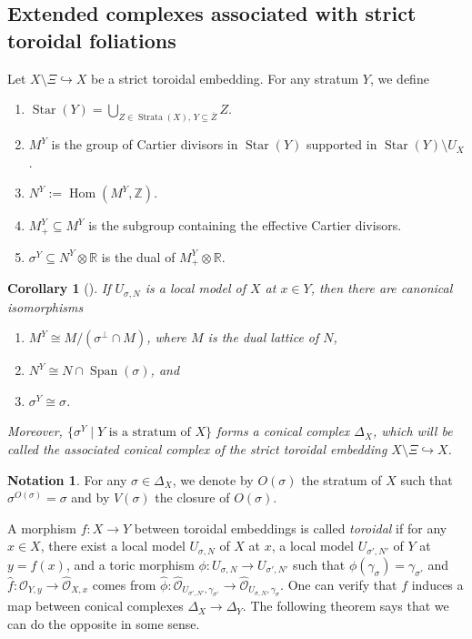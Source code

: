 \documentclass[12pt,reqno]{amsart}
\newtheorem{corollary}[theorem]{Corollary}
\theoremstyle{definition}
\newtheorem{notation}[theorem]{Notation}
\newcommand{\on}{\operatorname}
\newcommand\cO{{\mathcal{O}}}
\newcommand\bR{{\mathbb R}}
\newcommand\bZ{{\mathbb Z}}
\begin{document}
\subsection{Extended complexes associated with strict toroidal foliations}
Let $X\setminus\Xi\hookrightarrow X$ be a strict toroidal embedding. 
For any stratum $Y$, we define 
    \begin{enumerate}
        \item $\on{Star}(Y) = \bigcup_{Z\in\on{Strata}(X),\,Y\subseteq\overline{Z}}Z$. 
        \item $M^Y$ is the group of Cartier divisors in $\on{Star}(Y)$ supported in $\on{Star}(Y)\setminus U_X$. 
        \item $N^Y:=\on{Hom}(M^Y,\bZ)$. 
        \item $M^Y_+\subseteq M^Y$ is the subgroup containing the effective Cartier divisors. 
        \item $\sigma^Y\subseteq N^Y\otimes\bR$ is the dual of $M^Y_+\otimes\bR$. 
    \end{enumerate}
    \begin{corollary}[{\cite[Chapter2, Corollary 1 and page 71]{KKMS1973toroidal}}]\label{cor:stratum_vs_local_model} 
        If $U_{\sigma,N}$ is a local model of $X$ at $x\in Y$, then there are canonical isomorphisms
        \begin{enumerate}
            \item $M^Y\cong M/(\sigma^\perp\cap M)$, where $M$ is the dual lattice of $N$, 
            \item $N^Y \cong N \cap\on{Span}(\sigma)$, and 
            \item $\sigma^Y\cong\sigma$. 
        \end{enumerate}
        Moreover, $\{\sigma^Y\mid Y\mbox{ is a stratum of } X\}$ forms a conical complex $\Delta_X$, which will be called the \emph{associated conical complex} of the strict toroidal embedding $X\setminus\Xi\hookrightarrow X$. 
    \end{corollary}

\begin{notation}\label{notn:toroidal_orbit}
    For any $\sigma\in\Delta_X$, we denote by $O(\sigma)$ the stratum of $X$ such that $\sigma^{O(\sigma)}=\sigma$ and by $V(\sigma)$ the closure of $O(\sigma)$. 
\end{notation}


A morphism $f\colon X\to Y$ between toroidal embeddings is called \emph{toroidal} if for any $x\in X$, there exist a local model $U_{\sigma,N}$ of $X$ at $x$, a local model $U_{\sigma',N'}$ of $Y$ at $y=f(x)$, and a toric morphism $\phi\colon U_{\sigma,N}\to U_{\sigma',N'}$ such that $\phi(\gamma_\sigma)=\gamma_{\sigma'}$ and $\widehat f\colon  \widehat\cO_{Y,y}\to\widehat\cO_{X,x} $ comes from $\widehat\phi\colon \widehat\cO_{U_{\sigma',N'},\gamma_{\sigma'}}\to \widehat\cO_{U_{\sigma,N},\gamma_\sigma}$. One can verify that $f$ induces a map between conical complexes $\Delta_X\to\Delta_{Y}$. The following theorem says that we can do the opposite in some sense. 
\end{document}
